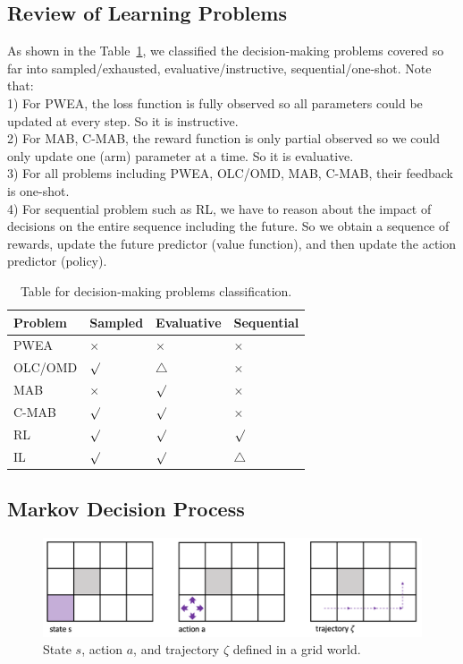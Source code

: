 \documentclass[11pt]{article}
\begin{document}
\subsection{Review of Learning Problems}
As shown in the Table~\ref{table:decision_making}, we classified the decision-making problems covered so far into sampled/exhausted, evaluative/instructive, sequential/one-shot. 
Note that:\\
1) For PWEA, the loss function is fully observed so all parameters could be updated at every step. So it is instructive. \\
2) For MAB, C-MAB, the reward function is only partial observed so we could only update one (arm) parameter at a time. So it is evaluative.\\
3) For all problems including PWEA, OLC/OMD, MAB, C-MAB, their feedback is one-shot. \\
4) For sequential problem such as RL, we have to reason about the impact of decisions on the entire sequence including the future. So we obtain a sequence of rewards, update the future predictor (value function), and then update the action predictor (policy).
\begin{table}[]
\centering
\begin{tabular}{|l|l|l|l|}
\hline
Problem & Sampled & Evaluative & Sequential \\ \hline
PWEA    &    $\times$     &      $\times$      &    $\times$        \\ \hline
OLC/OMD &    $\surd$     &      $\triangle$      &     $\times$       \\ \hline
MAB     &    $\times$     &      $\surd$       &     $\times$       \\ \hline
C-MAB   &    $\surd$     &       $\surd$      &      $\times$      \\ \hline
RL      &    $\surd$     &       $\surd$      &     $\surd$        \\ \hline
IL      &     $\surd$    &      $\surd$       &    $\triangle$        \\ \hline
\end{tabular}
\caption{Table for decision-making problems classification.}
\label{table:decision_making}
\end{table}

\subsection{Markov Decision Process}
\begin{figure}[htbp]
    \centering
\includegraphics[width=15cm]{imgs/Grid_World.png}
    \caption{State $s$, action $a$, and trajectory $\zeta$ defined in a grid world.}
    \label{fig:grid}
\end{figure} 
\end{document}
